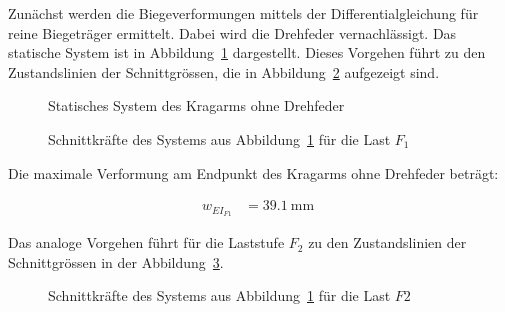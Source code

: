 \documentclass[
  11pt,
  letterpaper,
]{scrreprt}
\begin{document}
Zunächst werden die Biegeverformungen mittels der Differentialgleichung
für reine Biegeträger ermittelt. Dabei wird die Drehfeder
vernachlässigt. Das statische System ist in
Abbildung~\ref{fig-kragarm-sys} dargestellt. Dieses Vorgehen führt zu
den Zustandslinien der Schnittgrössen, die in
Abbildung~\ref{fig-skkragarmreal} aufgezeigt sind.

\begin{figure}[H]


\caption{\label{fig-kragarm-sys}Statisches System des Kragarms ohne
Drehfeder}

\end{figure}%

\begin{figure}[H]


\caption{\label{fig-skkragarmreal}Schnittkräfte des Systems aus
Abbildung~\ref{fig-kragarm-sys} für die Last \(F_1\)}

\end{figure}%

Die maximale Verformung am Endpunkt des Kragarms ohne Drehfeder beträgt:

$$
\begin{aligned}
w_{EI_{F1}} &= 39.1\ \mathrm{mm} \;
\end{aligned}
$$

Das analoge Vorgehen führt für die Laststufe \(F_2\) zu den
Zustandslinien der Schnittgrössen in der
Abbildung~\ref{fig-skkragarmreal_high}.

\begin{figure}[H]


\caption{\label{fig-skkragarmreal_high}Schnittkräfte des Systems aus
Abbildung~\ref{fig-kragarm-sys} für die Last \(F2\)}

\end{figure}%
\end{document}
